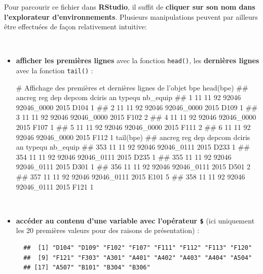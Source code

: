 \documentclass[12pt,twosided, notitlepage]{book}
\newenvironment{Shaded}{}{}
\newcommand{\KeywordTok}[1]{\textcolor[rgb]{0.00,0.00,1.00}{#1}}
\newcommand{\CommentTok}[1]{\textcolor[rgb]{0.00,0.50,0.00}{#1}}
\newcommand{\OperatorTok}[1]{#1}
\newcommand{\NormalTok}[1]{#1}
\renewenvironment{Shaded}{\begin{snugshade}}{\end{snugshade}}
\begin{document}
Pour parcourir ce fichier dans \textbf{RStudio}, il suffit de
\textbf{cliquer sur son nom dans l'explorateur d'environnements}.
Plusieurs manipulations peuvent par ailleurs être effectuées de façon
relativement intuitive:

~

\begin{itemize}
\item
  \textbf{afficher les premières lignes} avec la fonction
  \texttt{head()}, les \textbf{dernières lignes} avec la fonction
  \texttt{tail()}
  :

\begin{Shaded}
\begin{Highlighting}[]
\CommentTok{# Affichage des premières et dernières lignes de l'objet bpe}
\KeywordTok{head}\NormalTok{(bpe)}
\NormalTok{  ##   ancreg reg dep depcom     dciris   an typequ nb_equip}
\NormalTok{  ## 1     11  11  92  92046 92046_0000 2015   D104        1}
\NormalTok{  ## 2     11  11  92  92046 92046_0000 2015   D109        1}
\NormalTok{  ## 3     11  11  92  92046 92046_0000 2015   F102        2}
\NormalTok{  ## 4     11  11  92  92046 92046_0000 2015   F107        1}
\NormalTok{  ## 5     11  11  92  92046 92046_0000 2015   F111        2}
\NormalTok{  ## 6     11  11  92  92046 92046_0000 2015   F112        1}
\KeywordTok{tail}\NormalTok{(bpe)}
\NormalTok{  ##     ancreg reg dep depcom     dciris   an typequ nb_equip}
\NormalTok{  ## 353     11  11  92  92046 92046_0111 2015   D233        1}
\NormalTok{  ## 354     11  11  92  92046 92046_0111 2015   D235        1}
\NormalTok{  ## 355     11  11  92  92046 92046_0111 2015   D301        1}
\NormalTok{  ## 356     11  11  92  92046 92046_0111 2015   D501        2}
\NormalTok{  ## 357     11  11  92  92046 92046_0111 2015   E101        5}
\NormalTok{  ## 358     11  11  92  92046 92046_0111 2015   F121        1}
\end{Highlighting}
\end{Shaded}
\end{itemize}

~

\begin{itemize}
\item
  \textbf{accéder au contenu d'une variable avec l'opérateur
  \texttt{\$}}\index{\texttt{\$}} (ici uniquement les 20 premières
  valeurs pour des raisons de présentation) :

\begin{Shaded}
\end{Shaded}

\begin{verbatim}
  ##  [1] "D104" "D109" "F102" "F107" "F111" "F112" "F113" "F120"
  ##  [9] "F121" "F303" "A301" "A401" "A402" "A403" "A404" "A504"
  ## [17] "A507" "B101" "B304" "B306"
\end{verbatim}
\end{itemize}
\end{document}
